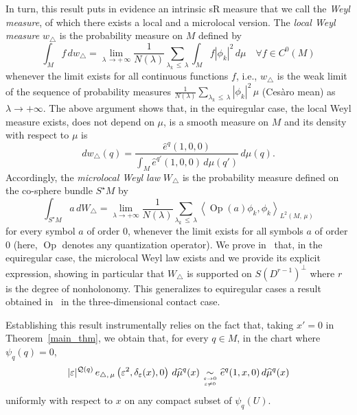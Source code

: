 \documentclass[AHL,Unicode,published]{cedram}
\newcommand{\calQ}{\mathcal{Q}}
\DeclareMathOperator{\Op}{Op}
\renewcommand{\leq}{\leqslant}
\let\oldforall\forall
\renewcommand*{\forall}{\mathrel{\oldforall}}
\begin{document}
In turn, this result puts in evidence an intrinsic sR measure that we call the \emph{Weyl measure}, of which there exists a local and a microlocal version. The \emph{local Weyl measure} $w_{\triangle}$ is the probability measure on $M$ defined by
\[
\int _M f \, dw_{\triangle} = \lim _{\lambda\,\rightarrow +\,\infty }\frac{1}{N(\lambda)}\sum _{\lambda_k\,\leq\,\lambda} \int_M f |\phi_k |^2 \, d\mu \quad \forall f\in C^0(M)
\]
whenever the limit exists for all continuous functions $f$, i.e., $w_{\triangle}$ is the weak limit of the sequence of probability measures $\frac{1}{N(\lambda)}\sum _{\lambda_k\,\leq\,\lambda } |\phi_k |^2 \, \mu $ (Cesàro mean) as $\lambda \rightarrow +\infty$. The above argument shows that, in the equiregular case, the local Weyl measure exists, does not depend on $\mu$, is a smooth measure on $M$ and its density with respect to $\mu$ is
\[
dw_{\triangle}(q) = \frac{\widehat{e}^{q}(1,0,0)}{\int_M \widehat{e}^{q'}(1,0,0)\, d\mu(q')} \, d\mu(q).
\]
Accordingly, the \emph{microlocal Weyl law} $W_\triangle$ is the probability measure defined on the co-sphere bundle $S^\star M$ by
\[
\int _{S^\star M} a \, dW_{\triangle} = \lim _{\lambda \rightarrow +\infty }\frac{1}{N(\lambda)}\sum _{\lambda_k\,\leq\, \lambda} \left\langle \Op (a)\phi_k, \phi_k \right\rangle_{L^2(M,\,\mu)}
\]
for every symbol $a$ of order $0$, whenever the limit exists for all symbols $a$ of order $0$ (here, $\Op$ denotes any quantization operator). We prove in~\cite{CHT-II} that, in the equiregular case, the microlocal Weyl law exists and we provide its explicit expression, showing in particular that $W_\triangle$ is supported on $S(D^{r-1})^\perp$ where $r$ is the degree of nonholonomy. This generalizes to equiregular cases a result obtained in~\cite{CHT-I} in the three-dimensional contact case.

Establishing this result instrumentally relies on the fact that, taking $x'=0$ in Theorem~\ref{main_thm}, we obtain that, for every $q\in M$, in the chart where $\psi_{q}(q)=0$,
\[
\vert\varepsilon\vert^{\calQ(q)}\, e_{\triangle,\,\mu}\left(\varepsilon^2,\delta_\varepsilon(x),0\right) \, d\widehat{\mu}^{q}(x)
\underset{\varepsilon\rightarrow 0\atop \varepsilon\neq 0}{\sim} \widehat{e}^{q}(1,x,0) \, d\widehat{\mu}^{q}(x)
\]
uniformly with respect to $x$ on any compact subset of $\psi_{q}(U)$.


\goodbreak
\end{document}
